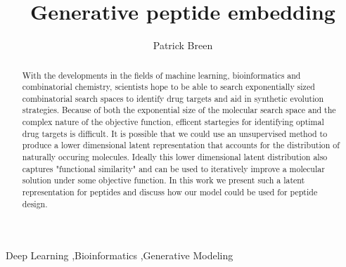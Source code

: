 \documentclass[preprint,12pt]{elsarticle}
\begin{document}
\begin{frontmatter}


\title{Generative peptide embedding}




\author{Patrick Breen}

\address{Athens Georgia, United States}

\begin{abstract}
With the developments in the fields of machine learning, bioinformatics and combinatorial chemistry, scientists hope to be able to search exponentially sized combinatorial search spaces to identify drug targets and aid in synthetic evolution strategies. Because of both the exponential size of the molecular search space and the complex nature of the objective function, efficent startegies for identifying optimal drug targets is difficult. It is possible that we could use an unsupervised method to produce a lower dimensional latent representation that accounts for the distribution of naturally occuring molecules. Ideally this lower dimensional latent distribution also captures "functional similarity" and can be used to iteratively improve a molecular solution under some objective function. In this work we present such a latent representation for peptides and discuss how our model could be used for peptide design.
\end{abstract}

\begin{keyword}
Deep Learning \sep Bioinformatics \sep Generative Modeling


\end{keyword}

\end{frontmatter}
\end{document}
